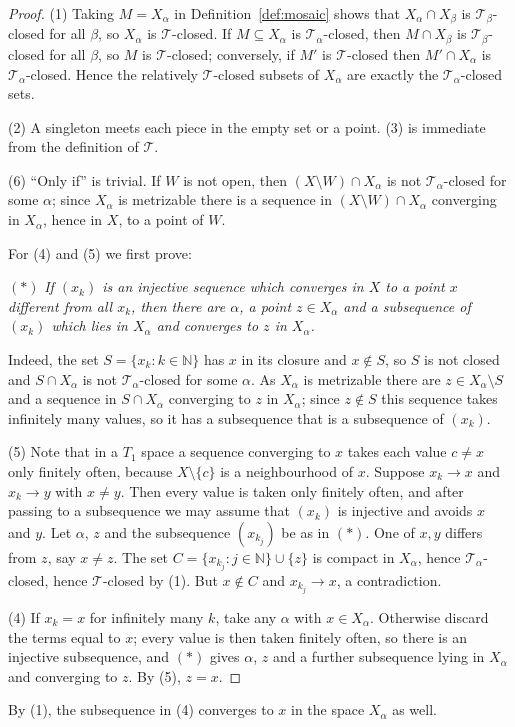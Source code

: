 \documentclass[11pt]{amsart}
\theoremstyle{definition}
\theoremstyle{remark}
\newcommand{\N}{\mathbb{N}}
\newcommand{\cT}{\mathcal{T}}
\numberwithin{equation}{section}
\begin{document}
\begin{proof}
(1) Taking $M=X_\alpha$ in Definition~\ref{def:mosaic} shows that $X_\alpha\cap X_\beta$ is $\cT_\beta$-closed for all $\beta$, so $X_\alpha$ is $\cT$-closed. If $M\subseteq X_\alpha$ is $\cT_\alpha$-closed, then $M\cap X_\beta$ is $\cT_\beta$-closed for all $\beta$, so $M$ is $\cT$-closed; conversely, if $M'$ is $\cT$-closed then $M'\cap X_\alpha$ is $\cT_\alpha$-closed. Hence the relatively $\cT$-closed subsets of $X_\alpha$ are exactly the $\cT_\alpha$-closed sets.

(2) A singleton meets each piece in the empty set or a point. (3) is immediate from the definition of $\cT$.

(6) ``Only if'' is trivial. If $W$ is not open, then $(X\setminus W)\cap X_\alpha$ is not $\cT_\alpha$-closed for some $\alpha$; since $X_\alpha$ is metrizable there is a sequence in $(X\setminus W)\cap X_\alpha$ converging in $X_\alpha$, hence in $X$, to a point of $W$.

For (4) and (5) we first prove:

\smallskip\noindent$(\ast)$ \emph{If $(x_k)$ is an injective sequence which converges in $X$ to a point $x$ different from all $x_k$, then there are $\alpha$, a point $z\in X_\alpha$ and a subsequence of $(x_k)$ which lies in $X_\alpha$ and converges to $z$ in $X_\alpha$.}

\smallskip\noindent Indeed, the set $S=\{x_k:k\in\N\}$ has $x$ in its closure and $x\notin S$, so $S$ is not closed and $S\cap X_\alpha$ is not $\cT_\alpha$-closed for some $\alpha$. As $X_\alpha$ is metrizable there are $z\in X_\alpha\setminus S$ and a sequence in $S\cap X_\alpha$ converging to $z$ in $X_\alpha$; since $z\notin S$ this sequence takes infinitely many values, so it has a subsequence that is a subsequence of $(x_k)$.

(5) Note that in a $T_1$ space a sequence converging to $x$ takes each value $c\neq x$ only finitely often, because $X\setminus\{c\}$ is a neighbourhood of $x$. Suppose $x_k\to x$ and $x_k\to y$ with $x\ne y$. Then every value is taken only finitely often, and after passing to a subsequence we may assume that $(x_k)$ is injective and avoids $x$ and $y$. Let $\alpha$, $z$ and the subsequence $(x_{k_j})$ be as in $(\ast)$. One of $x,y$ differs from $z$, say $x\ne z$. The set $C=\{x_{k_j}:j\in\N\}\cup\{z\}$ is compact in $X_\alpha$, hence $\cT_\alpha$-closed, hence $\cT$-closed by (1). But $x\notin C$ and $x_{k_j}\to x$, a contradiction.

(4) If $x_k=x$ for infinitely many $k$, take any $\alpha$ with $x\in X_\alpha$. Otherwise discard the terms equal to $x$; every value is then taken finitely often, so there is an injective subsequence, and $(\ast)$ gives $\alpha$, $z$ and a further subsequence lying in $X_\alpha$ and converging to $z$. By (5), $z=x$.
\end{proof}
By (1), the subsequence in (4) converges to $x$ in the space $X_\alpha$ as well.
\end{document}
